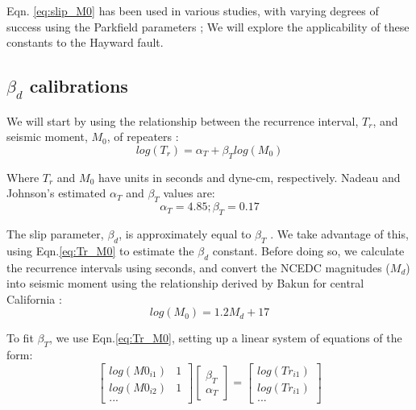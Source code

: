\documentclass{article}
\begin{document}
Eqn. \ref{eq:slip_M0} has been used in various studies, with varying degrees of success using the Parkfield parameters \cite{shakibay19,khoshmanesh15,chen08,igarashi03,matsuzawa02}; We will explore the applicability of these constants to the Hayward fault.

\subsection{$\beta_d$ calibrations}
We will start by using the relationship between the recurrence interval, $T_r$, and seismic moment, $M_0$, of repeaters \cite{nadeau98,chen07}:
\begin{equation}
    log(T_r) = \alpha_T + \beta_T log(M_0)
    \label{eq:Tr_M0}
\end{equation}

Where $T_r$ and $M_0$ have units in seconds and dyne-cm, respectively. Nadeau and Johnson's estimated $\alpha_T$ and $\beta_T$ values are:
\begin{equation}
    \alpha_T = 4.85; \beta_T = 0.17
    \label{eq:parkfield_const_Tr}
\end{equation}

The slip parameter, $\beta_d$, is approximately equal to $\beta_T$ \cite{nadeau98}. We take advantage of this, using Eqn.\ref{eq:Tr_M0} to estimate the $\beta_d$ constant. Before doing so, we calculate the recurrence intervals using seconds, and convert the NCEDC magnitudes ($M_d$) into seismic moment using the relationship derived by Bakun for central California \cite{bakun84}:
\begin{equation}
    log(M_0) = 1.2 M_d + 17
    \label{eq:md_conversion}
\end{equation}

To fit $\beta_T$, we use Eqn.\ref{eq:Tr_M0}, setting up a linear system of equations of the form:
\begin{equation}
    \begin{bmatrix}
        log(M0_{i1}) & 1 \\
        log(M0_{i2}) & 1 \\
        ...
    \end{bmatrix} 
    \begin{bmatrix}
        \beta_T \\
        \alpha_T
    \end{bmatrix}
    =
    \begin{bmatrix}
        log(Tr_{i1})\\
        log(Tr_{i1})\\
        ...
    \end{bmatrix}
    \label{eq:lsq_mx}
\end{equation}
\end{document}

